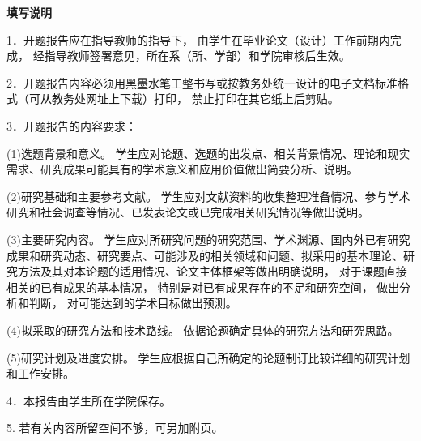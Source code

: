 \begin{center}
   \heiti
  \textbf{填写说明}
\end{center}

\vspace{0.8cm}
{
1．开题报告应在指导教师的指导下，
由学生在毕业论文（设计）工作前期内完成，
经指导教师签署意见，所在系（所、学部）和学院审核后生效。

2．开题报告内容必须用黑墨水笔工整书写或按教务处统一设计的电子文档标准格式（可从教务处网址上下载）打印，
禁止打印在其它纸上后剪贴。

3．开题报告的内容要求：

(1)选题背景和意义。
学生应对论题、选题的出发点、相关背景情况、理论和现实需求、研究成果可能具有的学术意义和应用价值做出简要分析、说明。

(2)研究基础和主要参考文献。
学生应对文献资料的收集整理准备情况、参与学术研究和社会调查等情况、已发表论文或已完成相关研究情况等做出说明。

(3)主要研究内容。
学生应对所研究问题的研究范围、学术渊源、国内外已有研究成果和研究动态、研究要点、可能涉及的相关领域和问题、拟采用的基本理论、研究方法及其对本论题的适用情况、论文主体框架等做出明确说明，
对于课题直接相关的已有成果的基本情况，
特别是对已有成果存在的不足和研究空间，
做出分析和判断，
对可能达到的学术目标做出预测。

(4)拟采取的研究方法和技术路线。
依据论题确定具体的研究方法和研究思路。

(5)研究计划及进度安排。
学生应根据自己所确定的论题制订比较详细的研究计划和工作安排。

4．本报告由学生所在学院保存。

5. 若有关内容所留空间不够，可另加附页。
}
\newpage
